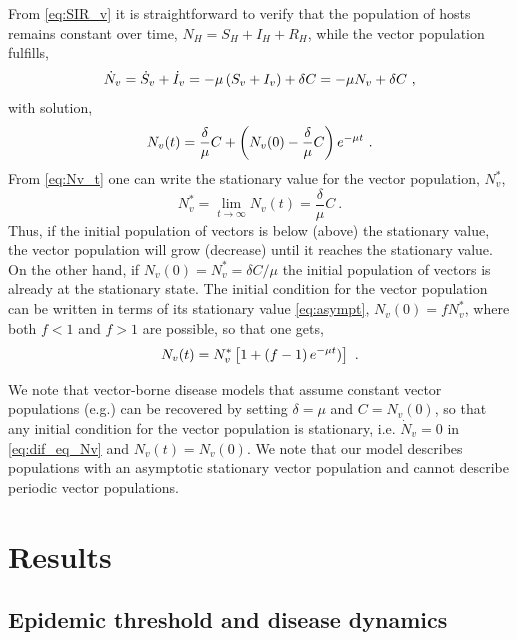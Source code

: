 From \cref{eq:SIR_v} it is straightforward to verify that the population of
hosts remains constant over time, $N_H=S_H+I_H+R_H$, while the vector
population fulfills,
\begin{equation}\label{eq:dif_eq_Nv}
    \dot{N}_v=\dot{S}_v+\dot{I}_v=-\mu\left(S_v+I_v\right)+\delta C=-\mu N_v
    + \delta C \ ,
\end{equation}
with solution,
\begin{equation}\label{eq:Nv_t}
    N_v(t)=\frac{\delta}{\mu}C +
    \left(N_v(0)-\frac{\delta}{\mu}C\right)e^{-\mu t} \ .
\end{equation}
From \cref{eq:Nv_t} one can write the stationary value for the vector
population, $N_v^*$,
\begin{equation}
    N_v^*=\lim_{t\to\infty}N_v(t)=\frac{\delta}{\mu}C \ .
    \label{eq:asympt}
\end{equation}
Thus, if the initial population of vectors is below (above) the stationary
value, the vector population will grow (decrease) until it reaches the
stationary value. On the other hand, if $N_v(0)=N_v^*=\delta C/\mu$ the initial
population of vectors is already at the stationary state. The initial condition
for the vector population can be written in terms of its stationary value
\cref{eq:asympt}, $N_v(0)=fN_v^*$, where both $f<1$ and $f>1$ are possible, so
that one gets,
\begin{equation}\label{eq:Nv_t_fraction}
    N_v(t)=N_v^*\claudator{1+\parentesi{f-1}e^{-\mu t})} \ .
\end{equation}

We note that vector-borne disease models that assume constant vector
populations (e.g.\cite{Brauer2016}) can be recovered by setting $\delta=\mu$
and $C=N_v(0)$, so that any initial condition for the vector population is
stationary, i.e. $\dot{N}_v=0$ in \cref{eq:dif_eq_Nv} and $N_v(t)=N_v(0)$. We
note that our model describes populations with an asymptotic stationary vector
population and cannot describe periodic vector populations.

\section{Results} \label{sec:results}

\subsection{Epidemic threshold and disease dynamics}
\label{sec:R0statvp}

